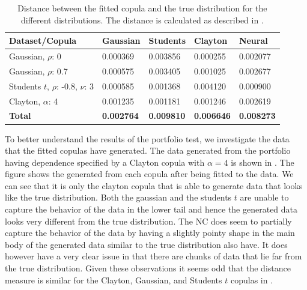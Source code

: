 \begin{table}[h!]
    \centering
    \caption{Distance between the fitted copula and the true distribution for the different distributions. The distance is calculated as described in .}
    \begin{tabular}{lllll}
    \textbf{Dataset/Copula} & \textbf{Gaussian} & \textbf{Students} & \textbf{Clayton} & \textbf{Neural} \\
    \hline
    Gaussian, $\rho$: 0               & 0.000369 & 0.003856 & 0.000255 & 0.002077 \\
    Gaussian, $\rho$: 0.7             & 0.000575 & 0.003405 & 0.001025 & 0.002677 \\
    Students $t$, $\rho$: -0.8, $\nu$: 3 & 0.000585 & 0.001368 & 0.004120 & 0.000900 \\ 
    Clayton, $\alpha$: 4              & 0.001235 & 0.001181 & 0.001246 & 0.002619 \\ %
    \textbf{Total}      & \textbf{0.002764} & \textbf{0.009810} & \textbf{0.006646} & \textbf{0.008273} \\
    \end{tabular}
    \label{tab:DistributionDistances}
\end{table}

To better understand the results of the portfolio test, we investigate the data that the fitted copulas have generated. The data generated from the portfolio having dependence specified by a Clayton copula with $\alpha=4$ is shown in . The figure shows the generated from each copula after being fitted to the data. We can see that it is only the clayton copula that is able to generate data that looks like the true distribution. Both the gaussian and the students $t$ are unable to capture the behavior of the data in the lower tail and hence the generated data looks very different from the true distribution. The \gls{NC} does seem to partially capture the behavior of the data by having a slightly pointy shape in the main body of the generated data similar to the true distribution also have. It does however have a very clear issue in that there are chunks of data that lie far from the true distribution. Given these observations it seems odd that the distance measure is similar for the Clayton, Gaussian, and Students $t$ copulas in . 

